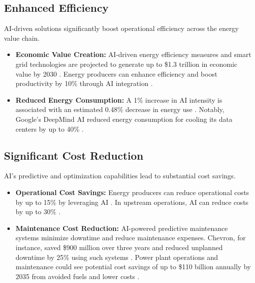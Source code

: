 \subsection{Enhanced Efficiency}
AI-driven solutions significantly boost operational efficiency across the energy value chain.
\begin{itemize}
    \item \textbf{Economic Value Creation:} AI-driven energy efficiency measures and smart grid technologies are projected to generate up to \$1.3 trillion in economic value by 2030 \cite{WEF_AI_Energy_2023}. Energy producers can enhance efficiency and boost productivity by 10\% through AI integration \cite{WEF_AI_Energy_2023}.
    \item \textbf{Reduced Energy Consumption:} A 1\% increase in AI intensity is associated with an estimated 0.48\% decrease in energy use \cite{MDPI_AI_Energy}. Notably, Google's DeepMind AI reduced energy consumption for cooling its data centers by up to 40\% \cite{FEPBL_DeepMind}.
\end{itemize}

\subsection{Significant Cost Reduction}
AI's predictive and optimization capabilities lead to substantial cost savings.
\begin{itemize}
    \item \textbf{Operational Cost Savings:} Energy producers can reduce operational costs by up to 15\% by leveraging AI \cite{WEF_AI_Energy_2023}. In upstream operations, AI can reduce costs by up to 30\% \cite{AInvest_Chevron}.
    \item \textbf{Maintenance Cost Reduction:} AI-powered predictive maintenance systems minimize downtime and reduce maintenance expenses. Chevron, for instance, saved \$900 million over three years and reduced unplanned downtime by 25\% using such systems \cite{AInvest_Chevron}. Power plant operations and maintenance could see potential cost savings of up to \$110 billion annually by 2035 from avoided fuels and lower costs \cite{IEA_AI_Energy}.
\end{itemize}

